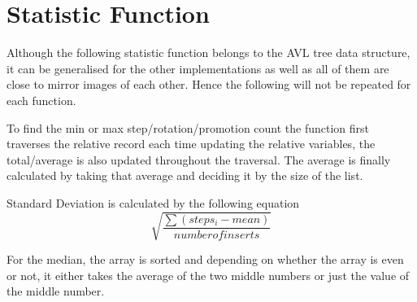 \documentclass[12pt, a4paper]{report}
\begin{document}
\section{Statistic Function}
Although the following statistic function belongs to the AVL tree data structure, it can be generalised for the other implementations as well as all of them are close to mirror images of each other. Hence the following will not be repeated for each function.

To find the min or max step/rotation/promotion count the function first traverses the relative record each time updating the relative variables, the total/average is also updated throughout the traversal. The average is finally calculated by taking that average and deciding it by the size of the list.

Standard Deviation is calculated by the following equation 
$$\sqrt{\frac{\sum{(steps_i - mean)}}{number of inserts}}$$

For the median, the array is sorted and depending on whether the array is even or not, it either takes the average of the two middle numbers or just the value of the middle number.
\end{document}

